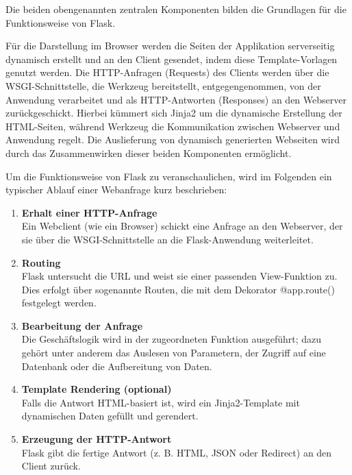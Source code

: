 Die beiden obengenannten zentralen Komponenten bilden die Grundlagen für die Funktionsweise von Flask.

Für die Darstellung im Browser werden die Seiten der Applikation serverseitig dynamisch erstellt und an den Client gesendet, indem diese Template-Vorlagen genutzt werden.
Die HTTP-Anfragen (Requests) des Clients werden über die WSGI-Schnittstelle, die Werkzeug bereitstellt, entgegengenommen, von der Anwendung verarbeitet und als HTTP-Antworten (Responses) an den Webserver zurückgeschickt. Hierbei kümmert sich Jinja2 um die dynamische Erstellung der HTML-Seiten, während Werkzeug die Kommunikation zwischen Webserver und Anwendung regelt. Die Auslieferung von dynamisch generierten Webseiten wird durch das Zusammenwirken dieser beiden Komponenten ermöglicht.

Um die Funktionsweise von Flask zu veranschaulichen, wird im Folgenden ein typischer Ablauf einer Webanfrage kurz beschrieben: \cite{FlaskLifecycle,Kennedy2024_FlaskRequests}
\begin{enumerate}

    \item \textbf{Erhalt einer HTTP-Anfrage}\\
Ein Webclient (wie ein Browser) schickt eine Anfrage an den Webserver, der sie über die WSGI-Schnittstelle an die Flask-Anwendung weiterleitet.

    \item \textbf{Routing}\\
Flask untersucht die \ac{URL} und weist sie einer passenden View-Funktion zu.  Dies erfolgt über sogenannte Routen, die mit dem Dekorator @app.route() festgelegt werden.

    \item \textbf{Bearbeitung der Anfrage}\\
Die Geschäftslogik wird in der zugeordneten Funktion ausgeführt; dazu gehört unter anderem das Auslesen von Parametern, der Zugriff auf eine Datenbank oder die Aufbereitung von Daten.

    \item \textbf{Template Rendering (optional)}\\
Falls die Antwort HTML-basiert ist, wird ein Jinja2-Template mit dynamischen Daten gefüllt und gerendert.

    \item \textbf{Erzeugung der HTTP-Antwort}\\
Flask gibt die fertige Antwort (z. B. HTML, \ac{JSON} oder Redirect) an den Client zurück.

\end{enumerate}



